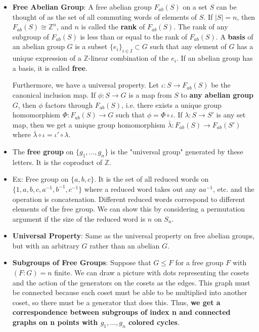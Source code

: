 \documentclass[11pt, oneside]{amsart}   	%
\theoremstyle{definition}
\begin{document}
\begin{itemize}

	\item \textbf{Free Abelian Group}: A free abelian group $F_{ab}(S)$ on a set $S$ can be thought of as the set of all commuting words of elements 
	of $S$. If $|S| = n$, then $F_{ab}(S)\cong \mathbb Z^n$, and $n$ is called the \textbf{rank} of $F_{ab}(S)$. The rank of any subgroup of $F_{ab}
	(S)$ is less than or equal to the rank of $F_{ab}(S)$. A \textbf{basis} of an abelian group $G$ is a subset $\{e_i\}_{i\in I}\subset G$ such that any 
	element of $G$ has a unique expression of a $\mathbb Z$-linear combination of the $e_i$. If an abelian group has a basis, it is called \textbf{free}.
	
	Furthermore, we have a universal property. Let $\iota : S\rightarrow F_{ab}(S)$ be the canonical inclusion map. If $\phi : S\rightarrow G$ is a map 
	from $S$ to \textbf{any abelian group $G$}, then $\phi$ factors through $F_{ab}(S)$, i.e. there exists a unique group homomorphism $\Phi : 
	F_{ab}(S)\rightarrow G$ such that $\phi = \Phi\circ\iota$. If $\lambda : S\rightarrow S'$ is any set map, then we get a unique group homomorphism 
	$\bar\lambda : F_{ab}(S)\rightarrow F_{ab}(S')$ where $\bar\lambda\circ\iota = \iota'\circ\lambda$.
	
	\item The \textbf{free group} on $\{g_1, ..., g_n\}$ is the "universal group" generated by these letters. It is the coproduct of $\mathbb Z$.
	
	\item Ex: Free group on $\{a, b, c\}$. It is the set of all reduced words on $\{1, a, b, c, a^{-1}, b^{-1}, c^{-1}\}$ where a reduced word takes out 
	any $aa^{-1}$, etc. and the operation is concatenation. Different reduced words correspond to different elements of the free group. We can show 
	this by considering a permutation argument if the size of the reduced word is $n$ on $S_n$.
	
	\item \textbf{Universal Property}: Same as the universal property on free abelian groups, but with an arbitrary $G$ rather than an abelian $G$. 
	
	\item \textbf{Subgroups of Free Groups}: Suppose that $G\leq F$ for a free group $F$ with $(F : G) = n$ finite. We can draw a picture with dots 
	representing the cosets and the action of the generators on the cosets as the edges. This graph must be connected because each coset must 
	be able to be multiplied into another coset, so there must be a generator that does this. Thus, \textbf{we get a correspondence between 
	subgroups of index n and connected graphs on n points with $g_1, ..., g_n$ colored cycles}.
	

\end{itemize}
\end{document}
